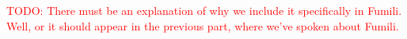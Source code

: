 
\textcolor{red}{
TODO: There must be an explanation of why we include it specifically in Fumili.
Well, or it should appear in the previous part, where we've spoken about Fumili.
}



%

